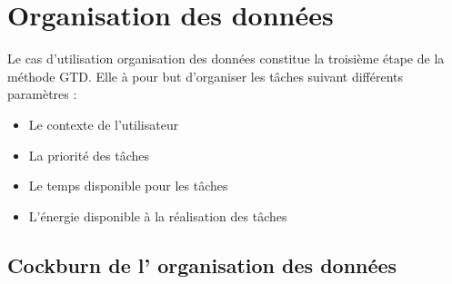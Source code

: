 \section {Organisation des données}

Le cas d'utilisation organisation des données constitue la troisième étape de la méthode GTD. Elle à pour but d'organiser les tâches suivant différents paramètres : \\
\begin{itemize}
\item Le contexte de l'utilisateur
\item La priorité des tâches
\item Le temps disponible pour les tâches
\item L'énergie disponible à la réalisation des tâches
\end{itemize}


\subsection*{Cockburn de l' organisation des données}


